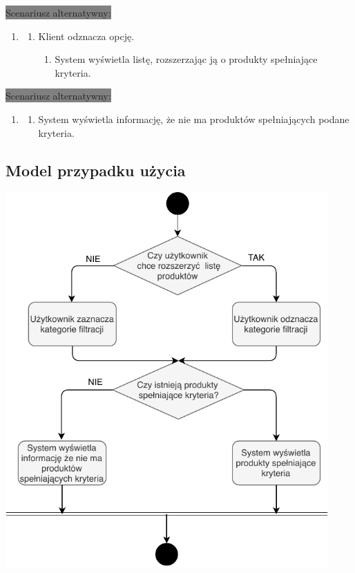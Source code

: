 \documentclass[12pt]{report}
\begin{document}
	\colorbox{grey}{Scenariusz alternatywny:}
	\begin{enumerate}\addtocounter{enumi}{1}
		\item[]
		\begin{enumerate}
			\item Klient odznacza opcję.
			\begin{enumerate}
				\item System wyświetla listę, rozszerzając ją o produkty spełniające kryteria.
			\end{enumerate}
		\end{enumerate}
	\end{enumerate}
	
	
	\colorbox{grey}{Scenariusz alternatywny:}
	\begin{enumerate}\addtocounter{enumi}{2}
		\item[]
		\begin{enumerate}
			\item System wyświetla informację, że nie ma produktów spełniających podane kryteria.
		\end{enumerate}
	\end{enumerate}

	\subsection{Model przypadku użycia}
	\begin{center}
		\includegraphics[width=350pt]{filtracja.pdf}
	\end{center}
	\newpage
\end{document}
